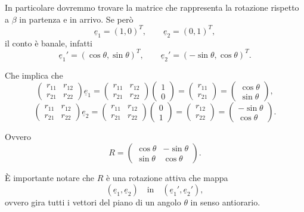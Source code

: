 In particolare dovremmo trovare la matrice che rappresenta la rotazione rispetto a $\beta$ in partenza e in arrivo. Se però
\[
\underline{e}_1=(1,0)^T,
\qquad
\underline{e}_2=(0,1)^T,
\]
il conto è banale, infatti
\[
\underline{e}_1'=(\cos\theta,\sin\theta)^T,
\qquad
\underline{e}_2'=(-\sin\theta,\cos\theta)^T.
\]

Che implica che
\[
\begin{pmatrix}
r_{11} & r_{12}\\
r_{21} & r_{22}
\end{pmatrix}
\underline{e}_1
=
\begin{pmatrix}
r_{11} & r_{12}\\
r_{21} & r_{22}
\end{pmatrix}
\begin{pmatrix}
1\\
0
\end{pmatrix}
=
\begin{pmatrix}
r_{11}\\
r_{21}
\end{pmatrix}
=
\begin{pmatrix}
\cos\theta\\
\sin\theta
\end{pmatrix},
\]
\[
\begin{pmatrix}
r_{11} & r_{12}\\
r_{21} & r_{22}
\end{pmatrix}
\underline{e}_2
=
\begin{pmatrix}
r_{11} & r_{12}\\
r_{21} & r_{22}
\end{pmatrix}
\begin{pmatrix}
0\\
1
\end{pmatrix}
=
\begin{pmatrix}
r_{12}\\
r_{22}
\end{pmatrix}
=
\begin{pmatrix}
-\sin\theta\\
\cos\theta
\end{pmatrix}.
\]

Ovvero
\[
R=
\begin{pmatrix}
\cos\theta & -\sin\theta\\
\sin\theta & \cos\theta
\end{pmatrix}.
\]

È importante notare che $R$ è una rotazione attiva che mappa
\[
(\underline{e}_1,\underline{e}_2)
\quad \text{in} \quad
(\underline{e}_1',\underline{e}_2'),
\]
ovvero gira tutti i vettori del piano di un angolo $\theta$ in senso antiorario.

